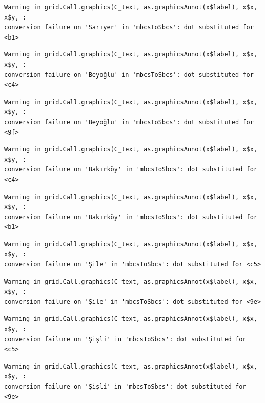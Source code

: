 \documentclass[
  11pt,
  a4paper,
  DIV=11,
  numbers=noendperiod]{scrartcl}
\begin{document}
\begin{verbatim}
Warning in grid.Call.graphics(C_text, as.graphicsAnnot(x$label), x$x, x$y, :
conversion failure on 'Sarıyer' in 'mbcsToSbcs': dot substituted for <b1>
\end{verbatim}

\begin{verbatim}
Warning in grid.Call.graphics(C_text, as.graphicsAnnot(x$label), x$x, x$y, :
conversion failure on 'Beyoğlu' in 'mbcsToSbcs': dot substituted for <c4>
\end{verbatim}

\begin{verbatim}
Warning in grid.Call.graphics(C_text, as.graphicsAnnot(x$label), x$x, x$y, :
conversion failure on 'Beyoğlu' in 'mbcsToSbcs': dot substituted for <9f>
\end{verbatim}

\begin{verbatim}
Warning in grid.Call.graphics(C_text, as.graphicsAnnot(x$label), x$x, x$y, :
conversion failure on 'Bakırköy' in 'mbcsToSbcs': dot substituted for <c4>
\end{verbatim}

\begin{verbatim}
Warning in grid.Call.graphics(C_text, as.graphicsAnnot(x$label), x$x, x$y, :
conversion failure on 'Bakırköy' in 'mbcsToSbcs': dot substituted for <b1>
\end{verbatim}

\begin{verbatim}
Warning in grid.Call.graphics(C_text, as.graphicsAnnot(x$label), x$x, x$y, :
conversion failure on 'Şile' in 'mbcsToSbcs': dot substituted for <c5>
\end{verbatim}

\begin{verbatim}
Warning in grid.Call.graphics(C_text, as.graphicsAnnot(x$label), x$x, x$y, :
conversion failure on 'Şile' in 'mbcsToSbcs': dot substituted for <9e>
\end{verbatim}

\begin{verbatim}
Warning in grid.Call.graphics(C_text, as.graphicsAnnot(x$label), x$x, x$y, :
conversion failure on 'Şişli' in 'mbcsToSbcs': dot substituted for <c5>
\end{verbatim}

\begin{verbatim}
Warning in grid.Call.graphics(C_text, as.graphicsAnnot(x$label), x$x, x$y, :
conversion failure on 'Şişli' in 'mbcsToSbcs': dot substituted for <9e>
\end{verbatim}
\end{document}
